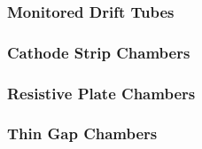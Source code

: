 		\subsubsection{Monitored Drift Tubes}\label{sssec:MDT}

		\subsubsection{Cathode Strip Chambers}\label{sssec:CST}

		\subsubsection{Resistive Plate Chambers}\label{sssec:RPC}

		\subsubsection{Thin Gap Chambers}\label{sssec:TGC}


		